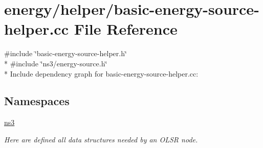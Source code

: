 \hypertarget{basic-energy-source-helper_8cc}{}\section{energy/helper/basic-\/energy-\/source-\/helper.cc File Reference}
\label{basic-energy-source-helper_8cc}
{\ttfamily \#include \char`\"{}basic-\/energy-\/source-\/helper.\+h\char`\"{}}\\*
{\ttfamily \#include \char`\"{}ns3/energy-\/source.\+h\char`\"{}}\\*
Include dependency graph for basic-\/energy-\/source-\/helper.cc\+:
\subsection*{Namespaces}
\begin{DoxyCompactItemize}
\item 
 \hyperlink{namespacens3}{ns3}
\begin{DoxyCompactList}\small\item\em Here are defined all data structures needed by an O\+L\+SR node. \end{DoxyCompactList}\end{DoxyCompactItemize}
